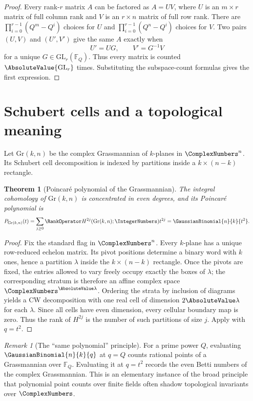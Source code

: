 \documentclass[11pt,a4paper,oneside,openany]{book}
\newtheorem{theorem}{Theorem}[chapter]
\theoremstyle{definition}
\theoremstyle{remark}
\newtheorem{remark}[remark]{Remark}
\newcommand{\F}{\mathbb F}
\begin{document}
\begin{proof}
Every rank-$r$ matrix $A$ can be factored as $A=UV$, where $U$ is an $m\times r$ matrix of full column rank and $V$ is an $r\times n$ matrix of full row rank.  There are
\(
 \prod_{i=0}^{r-1}(Q^m-Q^i)
\)
choices for $U$ and
\(
 \prod_{i=0}^{r-1}(Q^n-Q^i)
\)
choices for $V$.  Two pairs $(U,V)$ and $(U',V')$ give the same $A$ exactly when
\[
 U'=UG,\qquad V'=G^{-1}V
\]
for a unique $G\in\mathrm{GL}_r(\F_Q)$.  Thus every matrix is counted $\AbsoluteValue{\mathrm{GL}_r}$ times.  Substituting the subspace-count formulas gives the first expression.
\end{proof}

\section{Schubert cells and a topological meaning}

Let $\mathrm{Gr}(k,n)$ be the complex Grassmannian of $k$-planes in $\ComplexNumbers^n$.  Its Schubert cell decomposition is indexed by partitions inside a $k\times(n-k)$ rectangle.

\begin{theorem}[Poincar\'e polynomial of the Grassmannian]\label{thm:grassmann-poincare}
The integral cohomology of $\mathrm{Gr}(k,n)$ is concentrated in even degrees, and its Poincar\'e polynomial is
\[
 P_{\mathrm{Gr}(k,n)}(t)
 =\sum_{j\ge0}\RankOperator H^{2j}(\mathrm{Gr}(k,n);\IntegerNumbers)t^{2j}
 =\GaussianBinomial{n}{k}{t^2}.
\]
\end{theorem}

\begin{proof}
Fix the standard flag in $\ComplexNumbers^n$.  Every $k$-plane has a unique row-reduced echelon matrix.  Its pivot positions determine a binary word with $k$ ones, hence a partition $\lambda$ inside the $k\times(n-k)$ rectangle.  Once the pivots are fixed, the entries allowed to vary freely occupy exactly the boxes of $\lambda$; the corresponding stratum is therefore an affine complex space $\ComplexNumbers^{\AbsoluteValue\lambda}$.  Ordering the strata by inclusion of diagrams yields a CW decomposition with one real cell of dimension $2\AbsoluteValue\lambda$ for each $\lambda$.  Since all cells have even dimension, every cellular boundary map is zero.  Thus the rank of $H^{2j}$ is the number of such partitions of size $j$.  Apply  with $q=t^2$.
\end{proof}

\begin{remark}[The ``same polynomial'' principle]
For a prime power $Q$, evaluating $\GaussianBinomial{n}{k}{q}$ at $q=Q$ counts rational points of a Grassmannian over $\F_Q$.  Evaluating it at $q=t^2$ records the even Betti numbers of the complex Grassmannian.  This is an elementary instance of the broad principle that polynomial point counts over finite fields often shadow topological invariants over $\ComplexNumbers$.
\end{remark}
\end{document}
